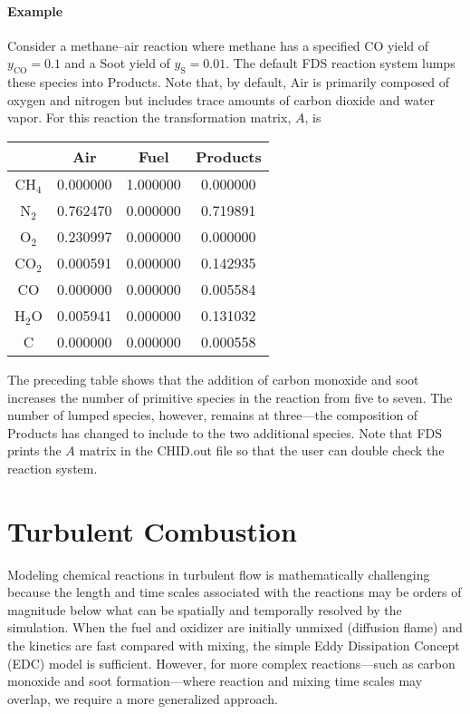 \paragraph{Example} Consider a methane--air reaction where methane has a specified CO yield of $y_{\mathrm{CO}}=0.1$ and a Soot yield of $y_{\mathrm{S}}=0.01$. The default FDS reaction system lumps these species into Products. Note that, by default, Air is primarily composed of oxygen and nitrogen but includes trace amounts of carbon dioxide and water vapor. For this reaction the transformation matrix, $A$, is
\begin{center}
\begin{tabular}{c c c c }
                   & Air & Fuel & Products \\ \hline
{CH$_4$}           & 0.000000 & 1.000000 & 0.000000 \\
{N$_2$}            & 0.762470 & 0.000000 & 0.719891 \\
{O$_2$}            & 0.230997 & 0.000000 & 0.000000 \\
{CO$_2$}           & 0.000591 & 0.000000 & 0.142935 \\
{CO}               & 0.000000 & 0.000000 & 0.005584 \\
{H$_2$O}           & 0.005941 & 0.000000 & 0.131032 \\
{C}                & 0.000000 & 0.000000 & 0.000558 \\
\end{tabular}
\end{center}

\noindent The preceding table shows that the addition of carbon monoxide and soot increases the number of primitive species in the reaction from five to seven. The number of lumped species, however, remains at three---the composition of Products has changed to include to the two additional species.  Note that FDS prints the $A$ matrix in the {\ct CHID.out} file so that the user can double check the reaction system.


\clearpage

\section{Turbulent Combustion}
\label{sec:batchreactormodel}

Modeling chemical reactions in turbulent flow is mathematically challenging because the length and time scales associated with the reactions may be orders of magnitude below what can be spatially and temporally resolved by the simulation.  When the fuel and oxidizer are initially unmixed (diffusion flame) and the kinetics are fast compared with mixing, the simple Eddy Dissipation Concept (EDC) model \cite{Magnussen:1,Poinsot:TNC} is sufficient.  However, for more complex reactions---such as carbon monoxide and soot formation---where reaction and mixing time scales may overlap, we require a more generalized approach.

